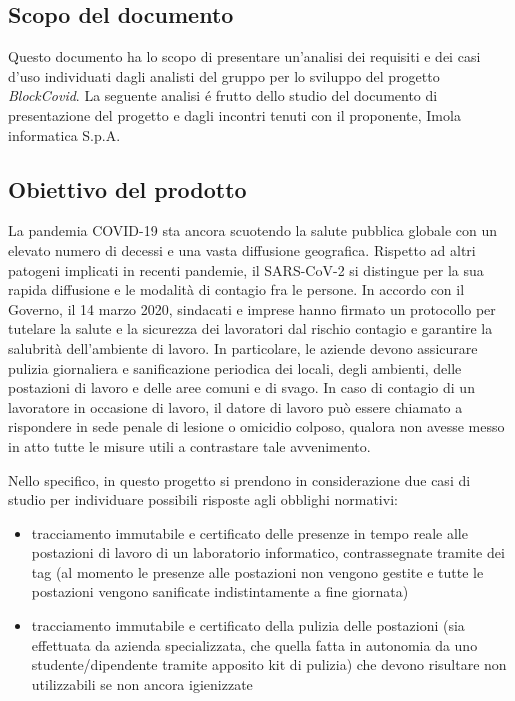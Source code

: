 \subsection{Scopo del documento}
Questo documento ha lo scopo di presentare un'analisi dei requisiti e dei casi d'uso individuati dagli analisti del gruppo \Gruppo{} per lo sviluppo del progetto \emph{BlockCovid}. La seguente analisi \'{e} frutto dello studio del documento di presentazione del progetto e dagli incontri tenuti con il proponente, Imola informatica S.p.A.

\subsection{Obiettivo del prodotto}
La pandemia COVID-19 sta ancora scuotendo la salute pubblica globale con un elevato numero di decessi e
una vasta diffusione geografica. Rispetto ad altri patogeni implicati in recenti pandemie, il SARS-CoV-2 si
distingue per la sua rapida diffusione e le modalità di contagio fra le persone.
In accordo con il Governo, il 14 marzo 2020, sindacati e imprese hanno firmato un protocollo per tutelare la
salute e la sicurezza dei lavoratori dal rischio contagio e garantire la salubrità dell’ambiente di lavoro. In
particolare, le aziende devono assicurare pulizia giornaliera e sanificazione periodica dei locali, degli
ambienti, delle postazioni di lavoro e delle aree comuni e di svago. In caso di contagio di un lavoratore in
occasione di lavoro, il datore di lavoro può essere chiamato a rispondere in sede penale di lesione o omicidio colposo, qualora non avesse messo in atto tutte le misure utili a contrastare tale
avvenimento.

Nello specifico, in questo progetto si prendono in considerazione due casi di studio per individuare possibili
risposte agli obblighi normativi:
\begin{itemize}
    \item tracciamento immutabile e certificato delle presenze in tempo reale alle postazioni di lavoro di un
    laboratorio informatico, contrassegnate tramite dei tag  (al momento le presenze alle postazioni
    non vengono gestite e tutte le postazioni vengono sanificate indistintamente a fine giornata)
    \item tracciamento immutabile e certificato della pulizia delle postazioni (sia effettuata da azienda
    specializzata, che quella fatta in autonomia da uno studente/dipendente tramite apposito kit di
    pulizia) che devono risultare non utilizzabili se non ancora igienizzate
\end{itemize}

